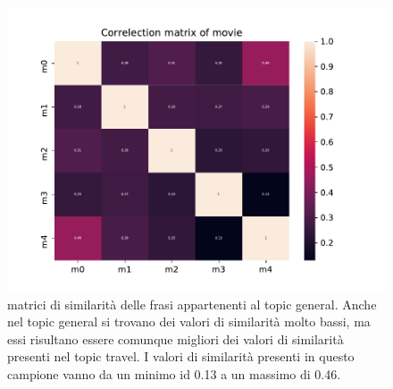\begin{figure}[h!t]
    \centering
    \includegraphics{Figure/simMatr/movie.pdf}
    \caption{matrici di similarità delle frasi appartenenti al topic general. Anche nel topic general si trovano dei valori di similarità molto bassi, ma essi risultano essere comunque migliori dei valori di similarità presenti nel topic travel. I valori di similarità presenti in questo campione vanno da un minimo id 0.13 a un massimo di 0.46.}
    \label{fig:mtrsim_g}
\end{figure}
\FloatBarrier

